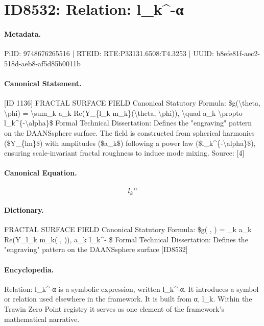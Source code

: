 \section*{ID8532: Relation: l\_k\textasciicircum{}-α}
\paragraph{Metadata.}
PiID: 9748676265516 | RTEID: RTE:P33131.6508:T4.3253 | UUID: b8efe81f-aec2-518d-aeb8-af5d85b0011b

\paragraph{Canonical Statement.}
[ID 1136] FRACTAL SURFACE FIELD Canonical Statutory Formula: \$g(\textbackslash{}theta, \textbackslash{}phi) = \textbackslash{}sum\_k a\_k Re(Y\_\{l\_k m\_k\}(\textbackslash{}theta, \textbackslash{}phi)), \textbackslash{}quad a\_k \textbackslash{}propto l\_k\textasciicircum{}\{-\textbackslash{}alpha\}\$ Formal Technical Dissertation: Defines the "engraving" pattern on the DAANSsphere surface. The field is constructed from spherical harmonics (\$Y\_\{lm\}\$) with amplitudes (\$a\_k\$) following a power law (\$l\_k\textasciicircum{}\{-\textbackslash{}alpha\}\$), ensuring scale-invariant fractal roughness to induce mode mixing. Source: [4]

\paragraph{Canonical Equation.}
\[
l_k^{-\alpha}
\]

\paragraph{Dictionary.}
FRACTAL SURFACE FIELD Canonical Statutory Formula: \$g( , ) = \_k a\_k Re(Y\_l\_k m\_k( , )), a\_k l\_k\textasciicircum{}- \$ Formal Technical Dissertation: Defines the "engraving" pattern on the DAANSsphere surface [ID8532]

\paragraph{Encyclopedia.}
Relation: l\_k\textasciicircum{}-α is a symbolic expression, written l\_k\textasciicircum{}-α. It introduces a symbol or relation used elsewhere in the framework. It is built from α, l\_k. Within the Trawin Zero Point registry it serves as one element of the framework's mathematical narrative.
